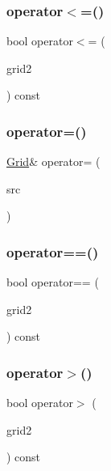 \mbox{\label{classGrid_adc972513ba66ac1e3e5847abe6e8666c}} 
\subsubsection{\texorpdfstring{operator$<$=()}{operator<=()}}
{\footnotesize\ttfamily bool operator$<$= (\begin{DoxyParamCaption}\item[{const \mbox{\hyperlink{classGrid}{Grid}}$<$ Value\+Type $>$ \&}]{grid2 }\end{DoxyParamCaption}) const}

\mbox{\label{classGrid_a4e17188bcb4ffb95efef313dcccc6813}} 
\subsubsection{\texorpdfstring{operator=()}{operator=()}}
{\footnotesize\ttfamily \mbox{\hyperlink{classGrid}{Grid}}\& operator= (\begin{DoxyParamCaption}\item[{const \mbox{\hyperlink{classGrid}{Grid}}$<$ Value\+Type $>$ \&}]{src }\end{DoxyParamCaption})\hspace{0.3cm}{\ttfamily [inline]}}

\mbox{\label{classGrid_ae321d29c4eab96f54c2f86929a345e2b}} 
\subsubsection{\texorpdfstring{operator==()}{operator==()}}
{\footnotesize\ttfamily bool operator== (\begin{DoxyParamCaption}\item[{const \mbox{\hyperlink{classGrid}{Grid}}$<$ Value\+Type $>$ \&}]{grid2 }\end{DoxyParamCaption}) const}

\mbox{\label{classGrid_aa2d6af2768a176d9ba044cf34087d766}} 
\subsubsection{\texorpdfstring{operator$>$()}{operator>()}}
{\footnotesize\ttfamily bool operator$>$ (\begin{DoxyParamCaption}\item[{const \mbox{\hyperlink{classGrid}{Grid}}$<$ Value\+Type $>$ \&}]{grid2 }\end{DoxyParamCaption}) const}

